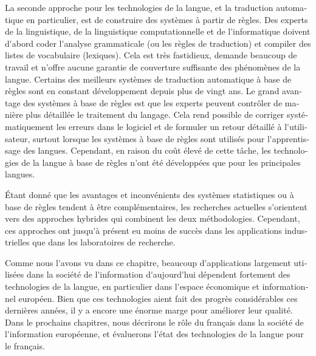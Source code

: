 \documentclass[]{../metanetpaper}
\begin{document}
\begin{french}
\begin{multicols}{2}
La seconde approche pour les technologies de la langue, et la
traduction automatique en particulier, est de construire des systèmes
à partir de règles. Des experts de la linguistique, de la linguistique
computationnelle et de l{\mbox '}informatique doivent d{\mbox '}abord
coder l{\mbox '}analyse grammaticale (ou les règles de traduction) et
compiler des listes de vocabulaire (lexiques). Cela est très
fastidieux, demande beaucoup de travail et n'offre aucune garantie de
couverture suffisante des phénomènes de la langue. Certains des
meilleurs systèmes de traduction automatique à base de règles sont en
constant développement depuis plus de vingt ans. Le grand avantage des
systèmes à base de règles est que les experts peuvent contrôler de
manière plus détaillée le traitement du langage. Cela rend possible de
corriger systématiquement les erreurs dans le logiciel et de formuler
un retour détaillé à l{\mbox '}utilisateur, surtout lorsque les
systèmes à base de règles sont utilisés pour l{\mbox '}apprentissage
des langues. Cependant, en raison du coût élevé de cette tâche, les
technologies de la langue à base de règles n{\mbox '}ont été
développées que pour les principales langues.


Étant donné que les avantages et inconvénients des systèmes
statistiques ou à base de règles tendent à être complémentaires, les
recherches actuelles s{\mbox '}orientent vers des approches hybrides qui
combinent les deux méthodologies. Cependant, ces approches ont jusqu{\mbox '}à
présent eu moins de succès dans les applications industrielles que
dans les laboratoires de recherche.

Comme nous l{\mbox '}avons vu dans ce chapitre, beaucoup d{\mbox '}applications
largement utilisées dans la société de l{\mbox '}information d{\mbox '}aujourd{\mbox '}hui
dépendent fortement des technologies de la langue, en particulier dans
l{\mbox '}espace économique et informationnel européen. Bien que ces
technologies aient fait des progrès considérables ces dernières
années, il y a encore une énorme marge pour améliorer leur
qualité. Dans le prochains chapitres, nous décrirons le rôle du
français dans la société de l{\mbox '}information européenne, et évaluerons
l{\mbox '}état des technologies de la langue pour le français.
\end{multicols}


\end{french}
\end{document}
